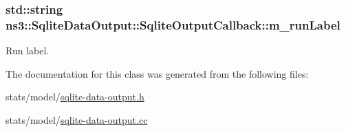 \subsubsection[{\texorpdfstring{m\+\_\+run\+Label}{m_runLabel}}]{\setlength{\rightskip}{0pt plus 5cm}std\+::string ns3\+::\+Sqlite\+Data\+Output\+::\+Sqlite\+Output\+Callback\+::m\+\_\+run\+Label\hspace{0.3cm}{\ttfamily [private]}}\hypertarget{classns3_1_1SqliteDataOutput_1_1SqliteOutputCallback_a95697997747ea145f2c3d07f9126afd9}{}\label{classns3_1_1SqliteDataOutput_1_1SqliteOutputCallback_a95697997747ea145f2c3d07f9126afd9}


Run label. 



The documentation for this class was generated from the following files\+:\begin{DoxyCompactItemize}
\item 
stats/model/\hyperlink{sqlite-data-output_8h}{sqlite-\/data-\/output.\+h}\item 
stats/model/\hyperlink{sqlite-data-output_8cc}{sqlite-\/data-\/output.\+cc}\end{DoxyCompactItemize}
